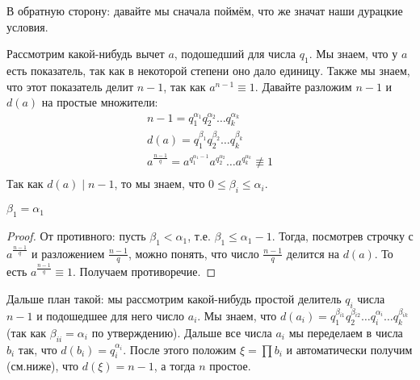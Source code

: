 		В обратную сторону: давайте мы сначала поймём, что же значат наши дурацкие условия.

		Рассмотрим какой-нибудь вычет $a$, подошедший для числа $q_1$.
		Мы знаем, что у $a$ есть показатель, так как в некоторой степени оно дало единицу.
		Также мы знаем, что этот показатель делит $n-1$, так как $a^{n-1}\equiv 1$.
		Давайте разложим $n-1$ и $d(a)$ на простые множители:
		\begin{gather*}
			n-1 = q_1^{\alpha_1}q_2^{\alpha_2}\dots q_k^{\alpha_k} \\
			d(a) = q_1^{\beta_1}q_2^{\beta_2}\dots q_k^{\beta_k} \\
			a^{\frac{n-1}{q}} = a^{q_1^{\alpha_1-1}}a^{q_2^{\alpha_2}}\dots a^{q_k^{\alpha_k}} \nequiv 1 \\
		\end{gather*}
		Так как $d(a) \mid n-1$, то мы знаем, что $0 \le \beta_i \le \alpha_i$.
		\begin{assertion}
			$\beta_1 = \alpha_1$
		\end{assertion}
		\begin{proof}
			От противного: пусть $\beta_1 < \alpha_1$, т.е. $\beta_1 \le \alpha_1-1$.
			Тогда, посмотрев строчку с $a^{\frac{n-1}{q}}$ и разложением $\frac{n-1}{q}$, можно понять, что
			число $\frac{n-1}{q}$ делится на $d(a)$.
			То есть $a^{\frac{n-1}{q}} \equiv 1$.
			Получаем противоречие.
		\end{proof}

		Дальше план такой: мы рассмотрим какой-нибудь простой делитель $q_i$ числа $n-1$ и подошедшее для него число $a_i$.
		Мы знаем, что $d(a_i)=q_1^{\beta_{i1}}q_2^{\beta_{i2}}\dots q_i^{\alpha_i} \dots q_k^{\beta_{ik}}$ (так как $\beta_{ii}=\alpha_i$ по утверждению).
		Дальше все числа $a_i$ мы переделаем в числа $b_i$ так, что $d(b_i)=q_i^{\alpha_i}$.
		После этого положим $\xi = \prod b_i$ и автоматически получим (см.ниже), что $d(\xi)=n-1$, а тогда $n$ простое.

